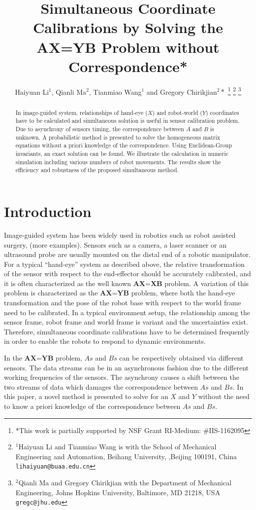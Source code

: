 \documentclass[letterpaper, 10 pt, conference]{ieeeconf}  %
\title{\LARGE \bf
Simultaneous Coordinate Calibrations by Solving the AX=YB Problem without Correspondence*
}
\author{Haiyuan Li$^{1}$, Qianli Ma$^{2}$, Tianmiao Wang$^{1}$ and Gregory Chirikjian$^{2}*$%
\thanks{*This work is partially
supported by NSF Grant RI-Medium: \#IIS-1162095}%
\thanks{$^{1}$Haiyuan Li and Tianmiao Wang is with the School of Mechanical Engineering and Automation, Beihang University,
        ,Beijing 100191, China
        {\tt\small lihaiyuan@buaa.edu.cn}}%
\thanks{$^{2}$Qianli Ma and Gregory Chirikjian with the Department of Mechanical Engineering, Johns Hopkins University,
        Baltimore, MD 21218, USA
        {\tt\small gregc@jhu.edu}}%
}
\begin{document}
\maketitle
\thispagestyle{empty}
\pagestyle{empty}


\begin{abstract}

In image-guided system, relationships of hand-eye ($X$) and robot-world ($Y$) coordinates have to be calculated and simultaneous solution is useful in sensor calibration problem. Due to asynchrony of sensors timing, the correspondence between $A$ and $B$ is unknown. A probabilistic method is presented to solve the
homogeneous matrix equations without a priori knowledge of the correspondence. Using Euclidean-Group invariants, an exact solution can be found. We illustrate the calculation in numeric simulation including various numbers of
robot movements. The results show the efficiency and robustness of the proposed simultaneous
method.

\end{abstract}



\section{Introduction}

Image-guided system has been widely used in robotics such as robot assisted surgery, (more examples). Sensors such as a camera, a laser scanner or an ultrasound probe are usually mounted on the distal end of a robotic manipulator. For a typical ``hand-eye'' system as described above, the relative transformation of the sensor with respect to the end-effector should be accurately calibrated, and it is often characterized as the well known $\textbf{AX=XB}$ problem. A variation of this problem is characterized as the $\textbf{AX=YB}$ problem, where both the hand-eye transformation and the pose of the robot base with respect to the world frame need to be calibrated. In a typical environment setup, the relationship among the sensor frame, robot frame and world frame is variant and the uncertainties exist. Therefore, simultaneous coordinate calibrations have to be determined frequently in order to enable the robots to respond to dynamic environments.

In the $\textbf{AX=YB}$ problem, $As$ and $Bs$ can be respectively obtained via different sensors. The data streams can be in an asynchronous fashion due to the different working frequencies of the sensors. The asynchrony causes a shift between the two streams of data which damages the correspondence between $As$ and $Bs$. In this paper, a novel method is presented to solve for an $X$ and $Y$ without the need to know a priori knowledge of the correspondence between $As$ and $Bs$.
\end{document}
